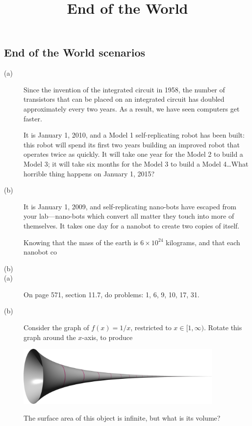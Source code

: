 \documentclass[12pt]{article}
\title{End of the World}
\begin{document}
\subsection*{End of the World scenarios}

\begin{description}

\item[(a)] Since the invention of the integrated circuit in 1958, the
  number of transistors that can be placed on an integrated circuit
  has doubled approximately every two years. As a result, we
  have seen computers get faster.

  It is January 1, 2010, and a Model 1 self-replicating robot has been
  built: this robot will spend its first two years building an
  improved robot that operates twice as quickly.  It will take one
  year for the Model 2 to build a Model 3; it will take six months for
  the Model 3 to build a Model 4\ldots What horrible thing happens on
  January 1, 2015?

\item[(b)] It is January 1, 2009, and self-replicating nano-bots have
  escaped from your lab---nano-bots which convert all matter they
  touch into more of themselves.  It takes one day for a nanobot to
  create two copies of itself.

  Knowing that the mass of the earth is $6 \times 10^{24}$ kilograms,
  and that each nanobot co

\item[(b)] 

\item[(a)] On page 571, section 11.7, do problems: 1, 6, 9, 10, 17, 31.

\vfill

\item[(b)] Consider the graph of $f(x) = 1/x$, restricted to $x \in
  [1,\infty)$.  Rotate this graph around the $x$-axis, to produce
\begin{center}
\includegraphics[width=4in]{GabrielHorn.pdf}
\end{center}
The surface area of this object is infinite, but what is its volume?


\end{description}
\end{document}
